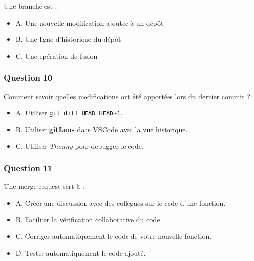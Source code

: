 \documentclass[]{article}
\providecommand{\tightlist}{%
  \setlength{\itemsep}{0pt}\setlength{\parskip}{0pt}}
\begin{document}
Une branche est :

\begin{itemize}
\tightlist
\item
  A. Une nouvelle modification ajoutée à un dépôt
\item
  B. Une ligne d'historique du dépôt
\item
  C. Une opération de fusion
\end{itemize}

\hypertarget{question-10}{%
\subsubsection{Question 10}\label{question-10}}

Comment savoir quelles modifications ont été apportées lors du dernier
commit ?

\begin{itemize}
\tightlist
\item
  A. Utiliser \texttt{git\ diff\ HEAD\ HEAD\textasciitilde{}1}.
\item
  B. Utiliser \textbf{gitLens} dans VSCode avec la vue historique.
\item
  C. Utiliser \emph{Thonny} pour debugger le code.
\end{itemize}

\hypertarget{question-11}{%
\subsubsection{Question 11}\label{question-11}}

Une merge request sert à :

\begin{itemize}
\tightlist
\item
  A. Créer une discussion avec des collègues sur le code d'une fonction.
\item
  B. Faciliter la vérification collaborative du code.
\item
  C. Corriger automatiquement le code de votre nouvelle fonction.
\item
  D. Tester automatiquement le code ajouté.
\end{itemize}
\end{document}
